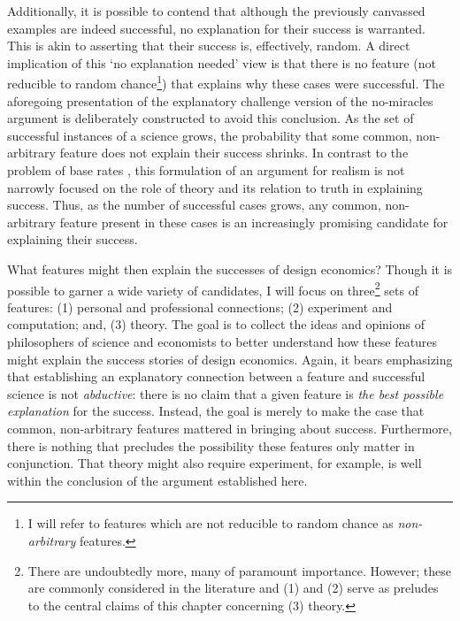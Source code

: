 Additionally, it is possible to contend that although the previously canvassed examples are indeed successful, no explanation for their success is warranted. This is akin to asserting that their success is, effectively, random. A direct implication of this `no explanation needed' view is that there is no feature (not reducible to random chance\footnote{I will refer to features which are not reducible to random chance as \textit{non-arbitrary} features.}) that explains why these cases were successful. The aforegoing presentation of the explanatory challenge version of the no-miracles argument is deliberately constructed to avoid this conclusion. As the set of successful instances of a science grows, the probability that some common, non-arbitrary feature does not explain their success shrinks. In contrast to the problem of base rates \autocite{callender2004}, this formulation of an argument for realism is not narrowly focused on the role of theory and its relation to truth in explaining success. Thus, as the number of successful cases grows, any common, non-arbitrary feature present in these cases is an increasingly promising candidate for explaining their success.

What features might then explain the successes of design economics? Though it is possible to garner a wide variety of candidates, I will focus on three\footnote{There are undoubtedly more, many of paramount importance. However; these are commonly considered in the literature and (1) and (2) serve as preludes to the central claims of this chapter concerning (3) theory.} sets of features: (1) personal and professional connections; (2) experiment and computation; and, (3) theory. The goal is to collect the ideas and opinions of philosophers of science and economists to better understand how these features might explain the success stories of design economics. Again, it bears emphasizing that establishing an explanatory connection between a feature and successful science is not \textit{abductive}: there is no claim that a given feature is \textit{the best possible explanation} for the success. Instead, the goal is merely to make the case that common, non-arbitrary features mattered in bringing about success. Furthermore, there is nothing that precludes the possibility these features only matter in conjunction. That theory might also require experiment, for example, is well within the conclusion of the argument established here. 

